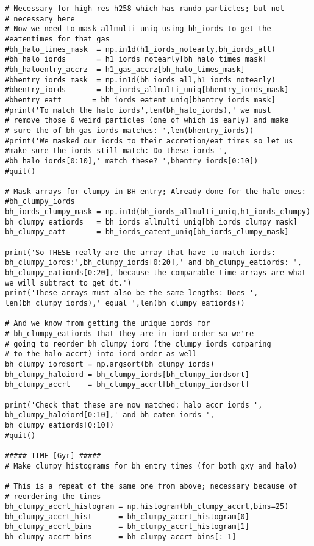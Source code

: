 \documentclass[12pt,headA,chapB]{fiskthesis}
\begin{document}
\begin{verbatim}
# Necessary for high res h258 which has rando particles; but not 
# necessary here
# Now we need to mask allmulti uniq using bh_iords to get the 
#eatentimes for that gas
#bh_halo_times_mask  = np.in1d(h1_iords_notearly,bh_iords_all)
#bh_halo_iords       = h1_iords_notearly[bh_halo_times_mask]
#bh_haloentry_accrz  = h1_gas_accrz[bh_halo_times_mask]
#bhentry_iords_mask  = np.in1d(bh_iords_all,h1_iords_notearly)
#bhentry_iords       = bh_iords_allmulti_uniq[bhentry_iords_mask]
#bhentry_eatt       = bh_iords_eatent_uniq[bhentry_iords_mask]
#print('To match the halo iords',len(bh_halo_iords),' we must  
# remove those 6 weird particles (one of which is early) and make 
# sure the of bh gas iords matches: ',len(bhentry_iords))
#print('We masked our iords to their accretion/eat times so let us 
#make sure the iords still match: Do these iords ',
#bh_halo_iords[0:10],' match these? ',bhentry_iords[0:10])
#quit()

# Mask arrays for clumpy in BH entry; Already done for the halo ones: 
#bh_clumpy_iords
bh_iords_clumpy_mask = np.in1d(bh_iords_allmulti_uniq,h1_iords_clumpy)
bh_clumpy_eatiords   = bh_iords_allmulti_uniq[bh_iords_clumpy_mask]
bh_clumpy_eatt       = bh_iords_eatent_uniq[bh_iords_clumpy_mask]

print('So THESE really are the array that have to match iords: 
bh_clumpy_iords:',bh_clumpy_iords[0:20],' and bh_clumpy_eatiords: ',
bh_clumpy_eatiords[0:20],'because the comparable time arrays are what 
we will subtract to get dt.')
print('These arrays must also be the same lengths: Does ',
len(bh_clumpy_iords),' equal ',len(bh_clumpy_eatiords))

# And we know from getting the unique iords for 
# bh_clumpy_eatiords that they are in iord order so we're 
# going to reorder bh_clumpy_iord (the clumpy iords comparing 
# to the halo accrt) into iord order as well
bh_clumpy_iordsort = np.argsort(bh_clumpy_iords)
bh_clumpy_haloiord = bh_clumpy_iords[bh_clumpy_iordsort]
bh_clumpy_accrt    = bh_clumpy_accrt[bh_clumpy_iordsort]

print('Check that these are now matched: halo accr iords ',
bh_clumpy_haloiord[0:10],' and bh eaten iords ',
bh_clumpy_eatiords[0:10])
#quit()

##### TIME [Gyr] #####
# Make clumpy histograms for bh entry times (for both gxy and halo)

# This is a repeat of the same one from above; necessary because of
# reordering the times 
bh_clumpy_accrt_histogram = np.histogram(bh_clumpy_accrt,bins=25)
bh_clumpy_accrt_hist      = bh_clumpy_accrt_histogram[0]
bh_clumpy_accrt_bins      = bh_clumpy_accrt_histogram[1]
bh_clumpy_accrt_bins      = bh_clumpy_accrt_bins[:-1]


\end{verbatim}
\end{document}
